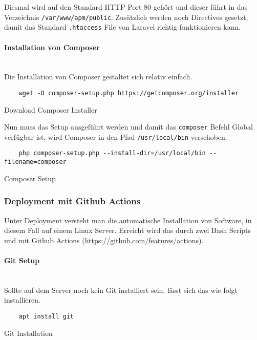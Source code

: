 Diesmal wird auf den Standard HTTP Port 80 gehört und dieser führt in das
Verzeichnis \verb|/var/www/apm/public|. Zusätzlich werden noch Directives
gesetzt, damit das Standard \verb|.htaccess| File von Laravel richtig
funktionieren kann.

\paragraph{Installation von Composer}\mbox{}\\

Die Installation von Composer gestaltet sich relativ einfach.

\begin{listing}[H]
  \begin{verbatim}
    wget -O composer-setup.php https://getcomposer.org/installer
  \end{verbatim}
  \caption{Download Composer Installer}
\end{listing}

Nun muss das Setup ausgeführt werden und damit das \verb|composer| Befehl Global
verfügbar ist, wird Composer in den Pfad \verb|/usr/local/bin| verschoben.

\begin{listing}[H]
  \begin{verbatim}
    php composer-setup.php --install-dir=/usr/local/bin --filename=composer
  \end{verbatim}
  \caption{Composer Setup}
\end{listing}

\subsubsection{Deployment mit Github Actions}
Unter Deployment versteht man die automatische Installation von Software, in
diesem Fall auf einem Linux Server. Erreicht wird das durch zwei Bash Scripts
und mit Github Actions (\url{https://github.com/features/actions}).

\paragraph{Git Setup}\mbox{}\\

Sollte auf dem Server noch kein Git installiert sein, lässt sich das wie folgt
installieren.

\begin{listing}[H]
  \begin{verbatim}
    apt install git
  \end{verbatim}
  \caption{Git Installation}
\end{listing}

